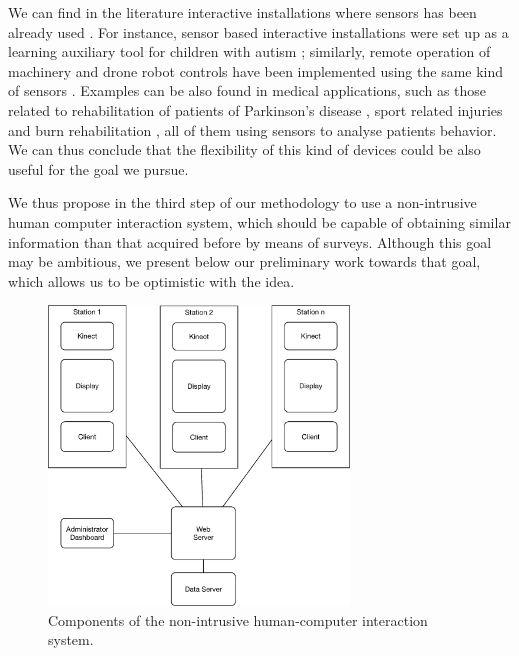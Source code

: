 \documentclass[graybox]{svmult}
\begin{document}
We can find in the literature interactive installations where sensors has been already used \cite{tieben2014playful}.  For instance, sensor based interactive installations were set up as a learning auxiliary tool for children with autism \cite{boutsika2014kinect}; similarly, remote operation of machinery and drone robot controls have been implemented using the same kind of sensors \cite{berra2013interfaz}. Examples can be also found in medical applications, such as those related to rehabilitation of patients of Parkinson's disease \cite{pompeu2015effect},  sport related injuries \cite{berra2013interfaz} and burn rehabilitation \cite{parry2014keeping}, all of them using sensors to analyse patients behavior.  We can thus conclude that the flexibility of this kind of devices could be also useful for the goal we pursue.

We thus propose in the third step of our methodology to use a non-intrusive human computer interaction system, which should be capable of obtaining similar information than that acquired before by means of surveys.  Although this goal may be ambitious, we present below our preliminary work towards that goal, which allows us to be optimistic with the idea.  





\begin{figure}[t]
\centering 
\includegraphics[width=8cm]{img/components.eps}
\caption{ Components of the non-intrusive human-computer interaction system.}
\label{fig:components}       %
\end{figure}
\end{document}
